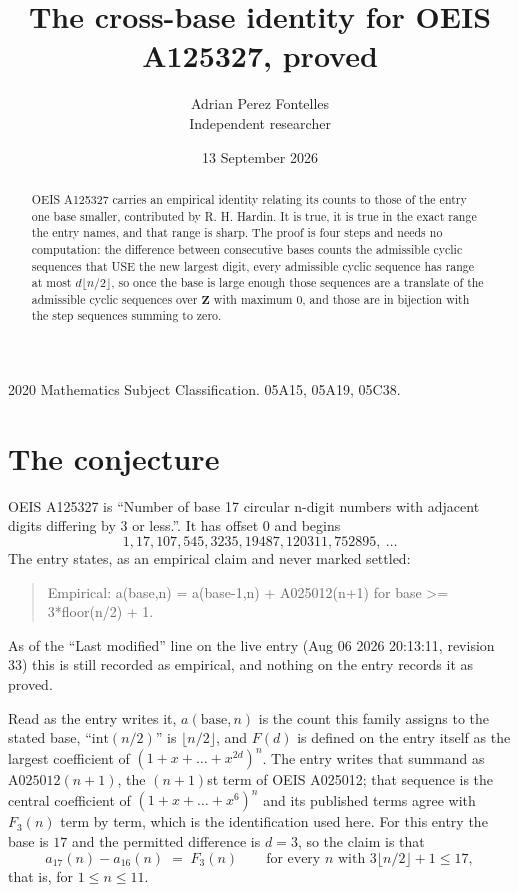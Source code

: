\documentclass[11pt,a4paper]{article}
\title{The cross-base identity for OEIS A125327, proved}
\author{Adrian Perez Fontelles\\ \small Independent researcher}
\date{13 September 2026}
\theoremstyle{plain}
\theoremstyle{definition}
\begin{document}
\maketitle

\begin{abstract}
OEIS A125327 carries an empirical identity relating its counts to those of the entry one base
smaller, contributed by R. H. Hardin. It is true, it is true in the exact range the entry
names, and that range is sharp. The proof is four steps and needs no computation: the
difference between consecutive bases counts the admissible cyclic sequences that USE the new
largest digit, every admissible cyclic sequence has range at most $d\lfloor n/2\rfloor$, so
once the base is large enough those sequences are a translate of the admissible cyclic
sequences over $\mathbf{Z}$ with maximum $0$, and those are in bijection with the step
sequences summing to zero.
\end{abstract}

\noindent\small 2020 Mathematics Subject Classification. 05A15, 05A19, 05C38.\normalsize

\section{The conjecture}

OEIS A125327 is ``Number of base 17 circular n-digit numbers with adjacent digits differing by 3 or less.''. It has offset $0$ and begins
\[
1, 17, 107, 545, 3235, 19487, 120311, 752895,\ \dots
\]
The entry states, as an empirical claim and never marked settled:
\begin{quote}
Empirical: a(base,n) = a(base-1,n) + A025012(n+1) for base >= 3*floor(n/2) + 1.
\end{quote}
As of the ``Last modified'' line on the live entry (Aug 06 2026 20:13:11, revision 33)
this is still recorded as empirical, and nothing on the entry records it as proved.

Read as the entry writes it, $a(\mathrm{base},n)$ is the count this family assigns to the
stated base, ``$\mathrm{int}(n/2)$'' is $\lfloor n/2\rfloor$, and $F(d)$ is defined on the
entry itself as the largest coefficient of $(1+x+\dots+x^{2d})^{n}$. The entry writes that summand as $\mathrm{A025012}(n+1)$, the $(n+1)$st term of OEIS A025012; that sequence is the central coefficient of $(1+x+\dots+x^{6})^{n}$ and its published terms agree with $F_{3}(n)$ term by term, which is the identification used here. For this entry
the base is $17$ and the permitted difference is $d=3$, so the claim is that
\[
a_{17}(n)-a_{16}(n)\;=\;F_{3}(n)
\qquad\text{for every } n \text{ with } 3\lfloor n/2\rfloor+1\le17,
\]
that is, for $1\le n\le11$.
\end{document}
